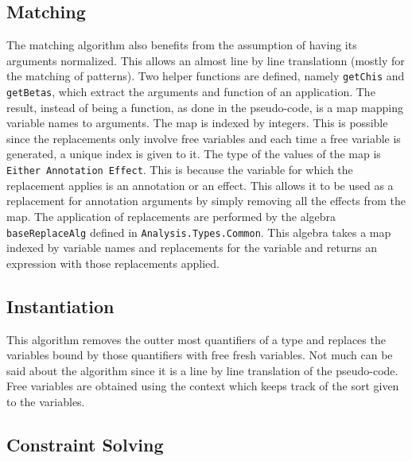 \documentclass[8pt]{extarticle}
\begin{document}
\subsection{Matching}
The matching algorithm also benefits from the assumption of having its arguments normalized. This allows an almost line by line translationn (mostly for the matching of patterns). Two helper functions are defined, namely \verb+getChis+ and \verb+getBetas+, which extract the arguments and function of an application. The result, instead of being a function, as done in the pseudo-code, is a map mapping variable names to arguments. The map is indexed by integers. This is possible since the replacements only involve free variables and each time a free variable is generated, a unique index is given to it. The type of the values of the map is \verb+Either Annotation Effect+. This is because the variable for which the replacement applies is an annotation or an effect. This allows it to be used as a replacement for annotation arguments by simply removing all the effects from the map. The application of replacements are performed by the algebra \verb+baseReplaceAlg+ defined in \verb+Analysis.Types.Common+. This algebra takes a map indexed by variable names and replacements for the variable and returns an expression with those replacements applied.
\subsection{Instantiation}
This algorithm removes the outter most quantifiers of a type and replaces the variables bound by those quantifiers with free fresh variables. Not much can be said about the algorithm since it is a line by line translation of the pseudo-code. Free variables are obtained using the context which keeps track of the sort given to the variables.
\subsection{Constraint Solving}
\end{document}
